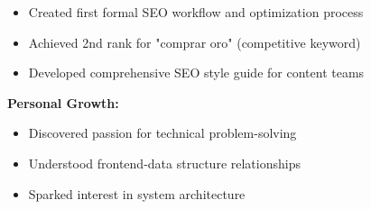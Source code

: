 \documentclass[a4paper,10pt]{article}
\begin{document}
{\begin{minipage}{\dimexpr\textwidth-2\fboxsep\relax}
		\vspace{0.2cm}
		\begin{itemize}[label=\textcolor{darkblue}{\textbullet}, leftmargin=*, nosep]
			\item Created first formal SEO workflow and optimization process
			\item Achieved 2nd rank for "comprar oro" (competitive keyword)
			\item Developed comprehensive SEO style guide for content teams
		\end{itemize}

		\vspace{0.2cm}
		\textbf{Personal Growth:}
		\vspace{0.2cm}
		\begin{itemize}[label=\textcolor{darkblue}{\textbullet}, leftmargin=*, nosep]
			\item Discovered passion for technical problem-solving
			\item Understood frontend-data structure relationships
			\item Sparked interest in system architecture
		\end{itemize}

		\vspace{0.2cm} %
\end{minipage}}


\end{document}
